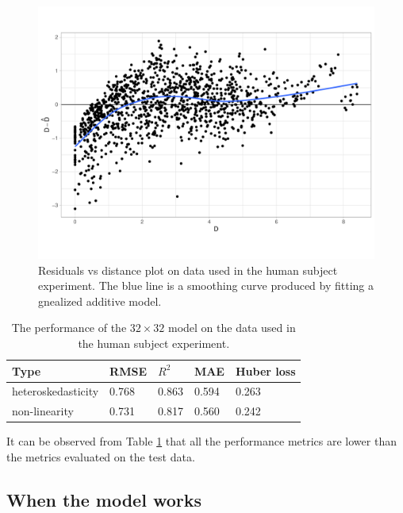 \documentclass[]{interact}
\theoremstyle{plain}%
\theoremstyle{definition}
\theoremstyle{remark}
\begin{document}
\begin{figure}

{\centering \includegraphics[width=1\linewidth]{paper_files/figure-latex/unnamed-chunk-2-1} 

}

\caption{Residuals vs distance plot on data used in the human subject experiment. The blue line is a smoothing curve produced by fitting a gnealized additive model.}\label{fig:unnamed-chunk-2}
\end{figure}

\begin{table}

\caption{\label{tab:experiment-performance}The performance of the $32 \times 32$ model on the data used in the human subject experiment.}
\centering
\begin{tabular}[t]{lllll}
\toprule
Type & RMSE & $R^2$ & MAE & Huber loss\\
\midrule
heteroskedasticity & 0.768 & 0.863 & 0.594 & 0.263\\
non-linearity & 0.731 & 0.817 & 0.560 & 0.242\\
\bottomrule
\end{tabular}
\end{table}

It can be observed from Table \ref{tab:experiment-performance} that all
the performance metrics are lower than the metrics evaluated on the test
data.

\hypertarget{when-the-model-works}{%
\subsection{When the model works}\label{when-the-model-works}}
\end{document}

